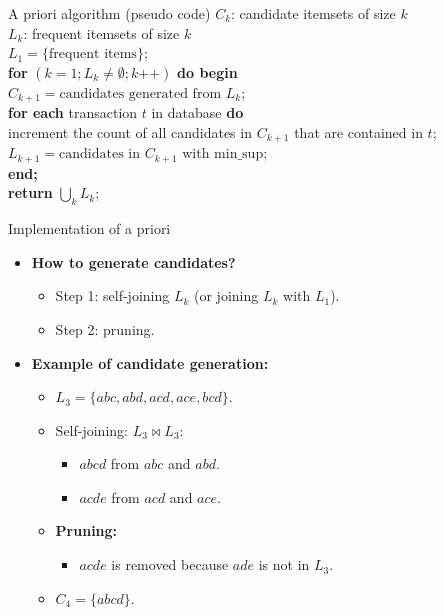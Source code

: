 \documentclass[aspectratio=169,t,xcolor=dvipsnames]{beamer}
\begin{document}
  {
    \begin{frame}{A priori algorithm (pseudo code)}
    $C_k$: candidate itemsets of size $k$\\
    $L_k$: frequent itemsets of size $k$\\[0.5cm]

    $L_1 = \{\text{frequent items}\}$;\\[0.5cm]
    \textbf{for} $(k=1; L_k \neq \emptyset; k\texttt{++})$ \textbf{do begin}\\
    \hspace{1cm} $C_{k+1} = \text{candidates generated from } L_k;$\\
    \hspace{1cm} \textbf{for each} transaction $t$ in database \textbf{do}\\
    \hspace{2cm} increment the count of all candidates in $C_{k+1}$ that are contained in $t$;\\[0.1cm]
    \hspace{1cm}$L_{k+1} = \text{candidates in } C_{k+1} \text{ with min\_sup};$\\
    \textbf{end;}\\[0.1cm]
    \textbf{return} $\bigcup_k L_k$;
    \end{frame}
  }

  {
    \begin{frame}{Implementation of a priori}
    \begin{itemize}
      \item \textbf{\color{airforceblue}How to generate candidates?}
      \begin{itemize}
        \item Step 1: self-joining $L_k$ (or joining $L_k$ with $L_1$).
        \item Step 2: pruning.
      \end{itemize}
      \item \textbf{Example of candidate generation:}
      \begin{itemize}
        \item $L_3 = \{abc, abd, acd, ace, bcd\}$.
        \item Self-joining: $L_3 \bowtie L_3$:
        \begin{itemize}
          \item $abcd$ from $abc$ and $abd$.
          \item $acde$ from $acd$ and $ace$.
        \end{itemize}
        \item \textbf{Pruning:}
        \begin{itemize}
          \item $acde$ is removed because $ade$ is not in $L_3$.
        \end{itemize}
        \item $C_4 = \{abcd\}$.
      \end{itemize}
    \end{itemize}
    \end{frame}
  }
\end{document}
